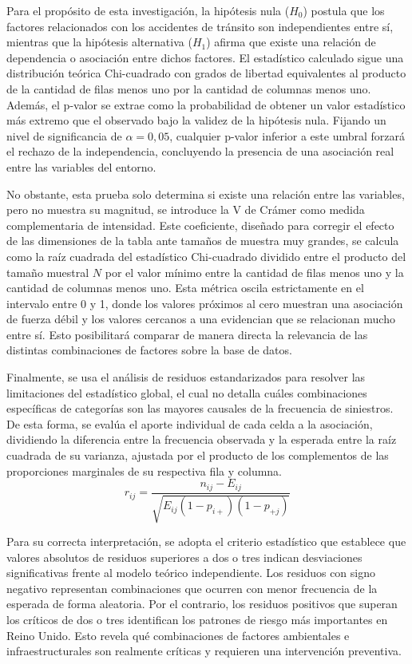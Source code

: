 \documentclass[12pt]{article}
\begin{document}
Para el propósito de esta investigación, la hipótesis nula ($H_0$) postula que los factores relacionados con los accidentes de tránsito son independientes entre sí, mientras que la hipótesis alternativa ($H_1$) afirma que existe una relación de dependencia o asociación entre dichos factores. El estadístico calculado sigue una distribución teórica Chi-cuadrado con grados de libertad equivalentes al producto de la cantidad de filas menos uno por la cantidad de columnas menos uno. Además, el p-valor se extrae como la probabilidad de obtener un valor estadístico más extremo que el observado bajo la validez de la hipótesis nula. Fijando un nivel de significancia de $\alpha = 0,05$, cualquier p-valor inferior a este umbral forzará el rechazo de la independencia, concluyendo la presencia de una asociación real entre las variables del entorno.

No obstante, esta prueba solo determina si existe una relación entre las variables, pero no muestra su magnitud, se introduce la V de Crámer como medida complementaria de intensidad. Este coeficiente, diseñado para corregir el efecto de las dimensiones de la tabla ante tamaños de muestra muy grandes, se calcula como la raíz cuadrada del estadístico Chi-cuadrado dividido entre el producto del tamaño muestral $N$ por el valor mínimo entre la cantidad de filas menos uno y la cantidad de columnas menos uno. Esta métrica oscila estrictamente en el intervalo entre 0 y 1, donde los valores próximos al cero muestran una asociación de fuerza débil y los valores cercanos a una evidencian que se relacionan mucho entre sí. Esto posibilitará comparar de manera directa la relevancia de las distintas combinaciones de factores sobre la base de datos.

Finalmente, se usa el análisis de residuos estandarizados para resolver las limitaciones del estadístico global, el cual no detalla cuáles combinaciones específicas de categorías son las mayores causales de la frecuencia de siniestros. De esta forma, se evalúa el aporte individual de cada celda a la asociación, dividiendo la diferencia entre la frecuencia observada y la esperada entre la raíz cuadrada de su varianza, ajustada por el producto de los complementos de las proporciones marginales de su respectiva fila y columna. 
 $$r_{ij} = \frac{n_{ij} - E_{ij}}{\sqrt{E_{ij}(1 - p_{i+})(1 - p_{+j})}}$$

 Para su correcta interpretación, se adopta el criterio estadístico que establece que valores absolutos de residuos superiores a dos o tres indican desviaciones significativas frente al modelo teórico independiente. Los residuos con signo negativo representan combinaciones que ocurren con menor frecuencia de la esperada de forma aleatoria. Por el contrario, los residuos positivos que superan los críticos de dos o tres identifican los patrones de riesgo más importantes en Reino Unido. Esto revela qué combinaciones de factores ambientales e infraestructurales son realmente críticas y requieren una intervención preventiva. 
\end{document}
